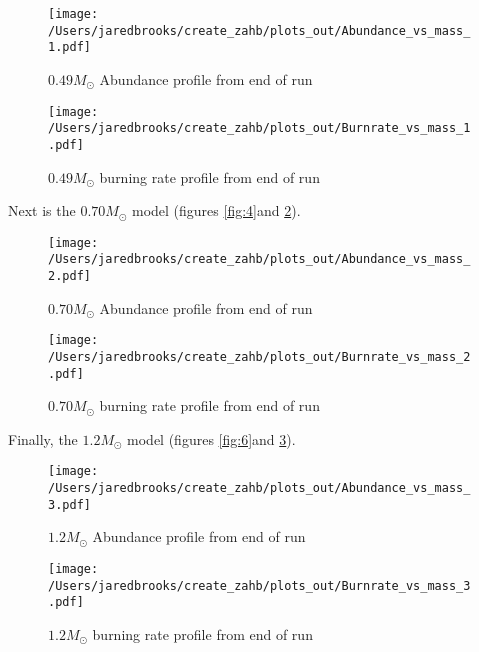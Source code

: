 \documentclass{article}
\begin{document}
        \begin{figure}[H]
          \begin{minipage}[b]{0.5\linewidth}
	    \centering
	    \texttt{[image: /Users/jaredbrooks/create\_zahb/plots\_out/Abundance\_vs\_mass\_1.pdf]}
	    \caption{$0.49 M_\odot$ Abundance profile from end of run}
	    \label{fig:2}
          \end{minipage}
          \hspace{0cm}
          \begin{minipage}[b]{0.5\linewidth}
            \centering
            \texttt{[image: /Users/jaredbrooks/create\_zahb/plots\_out/Burnrate\_vs\_mass\_1.pdf]}
            \caption{$0.49 M_\odot$ burning rate profile from end of run}
            \label{fig:3}
          \end{minipage}
	\end{figure}

        Next is the $0.70 M_\odot$ model (figures \ref{fig:4}and \ref{fig:5}).

        \begin{figure}[H]
          \begin{minipage}[b]{0.5\linewidth}
            \centering
            \texttt{[image: /Users/jaredbrooks/create\_zahb/plots\_out/Abundance\_vs\_mass\_2.pdf]}
            \caption{$0.70 M_\odot$ Abundance profile from end of run}
            \label{fig:4}
          \end{minipage}
          \hspace{0cm}
          \begin{minipage}[b]{0.5\linewidth}
            \centering
            \texttt{[image: /Users/jaredbrooks/create\_zahb/plots\_out/Burnrate\_vs\_mass\_2.pdf]}
            \caption{$0.70 M_\odot$ burning rate profile from end of run}
            \label{fig:5}
          \end{minipage}
        \end{figure}

        \pagebreak

        Finally, the $1.2 M_\odot$ model (figures \ref{fig:6}and \ref{fig:7}).

        \begin{figure}[H]
          \begin{minipage}[b]{0.5\linewidth}
            \centering
            \texttt{[image: /Users/jaredbrooks/create\_zahb/plots\_out/Abundance\_vs\_mass\_3.pdf]}
            \caption{$1.2 M_\odot$ Abundance profile from end of run}
            \label{fig:6}
          \end{minipage}
          \hspace{0cm}
          \begin{minipage}[b]{0.5\linewidth}
            \centering
            \texttt{[image: /Users/jaredbrooks/create\_zahb/plots\_out/Burnrate\_vs\_mass\_3.pdf]}
            \caption{$1.2 M_\odot$ burning rate profile from end of run}
            \label{fig:7}
          \end{minipage}
        \end{figure}
\end{document}
